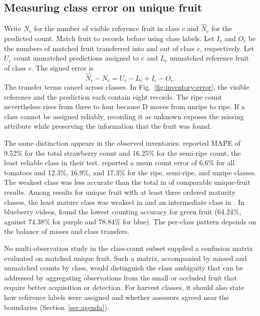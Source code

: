 \subsection{Measuring class error on unique fruit}

Write \(N_c\) for the number of visible reference fruit in class \(c\) and \(\widehat N_c\) for the predicted count. Match fruit to records before using class labels. Let \(I_c\) and \(O_c\) be the numbers of matched fruit transferred into and out of class \(c\), respectively. Let \(U_c\) count unmatched predictions assigned to \(c\) and \(L_c\) unmatched reference fruit of class \(c\). The signed error is
\begin{equation}
\widehat N_c - N_c = U_c - L_c + I_c - O_c.
\label{eq:class-flow}
\end{equation}
The transfer terms cancel across classes. In Fig.~\ref{fig:inventory-error}, the visible reference and the prediction each contain eight records. The ripe count nevertheless rises from three to four because D moves from unripe to ripe. If a class cannot be assigned reliably, recording it as unknown exposes the missing attribute while preserving the information that the fruit was found.

The same distinction appears in the observed inventories. \citet{ogundele2025real} reported MAPE of 9.52\% for the total strawberry count and 16.25\% for the semi-ripe count, the least reliable class in their test. \citet{wang2025tomato} reported a mean count error of 6.6\% for all tomatoes and 12.3\%, 16.9\%, and 17.3\% for the ripe, semi-ripe, and unripe classes. The weakest class was less accurate than the total in \nKelasLebih of \nKelasBanding comparable unique-fruit results. Among \nKelasUnik results for unique fruit with at least three ordered maturity classes, the least mature class was weakest in \nKelasUnikMentah and an intermediate class in \nKelasUnikTengah. In blueberry videos, \citet{wu2025maturity} found the lowest counting accuracy for green fruit (64.24\%, against 74.38\% for purple and 78.84\% for blue). The per-class pattern depends on the balance of misses and class transfers.

No multi-observation study in the class-count subset supplied a confusion matrix evaluated on matched unique fruit. Such a matrix, accompanied by missed and unmatched counts by class, would distinguish the class ambiguity that can be addressed by aggregating observations from the small or occluded fruit that require better acquisition or detection. For harvest classes, it should also state how reference labels were assigned and whether assessors agreed near the boundaries (Section~\ref{sec:agenda}).

